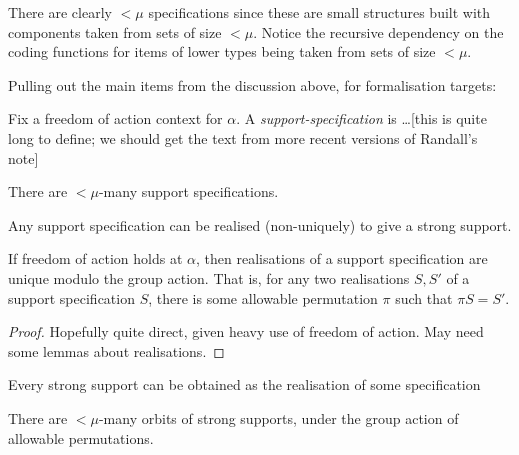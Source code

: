 There are clearly $<\mu$ specifications since these are small structures built with components taken from sets of size $<\mu$.  Notice the recursive dependency on the coding functions for items of lower types being taken from sets of size $<\mu$.

Pulling out the main items from the discussion above, for formalisation targets:

\begin{definition}
  \label{def:support-spec}
  Fix a freedom of action context for $\alpha$.  A \emph{support-specification} is \ldots [this is quite long to define; we should get the text from more recent versions of Randall’s note]
\end{definition}

\begin{lemma}
  \label{lem:count-support-specs}
  There are $<\mu$-many support specifications.
\end{lemma}

\begin{definition}
  \label{def:support-spec-realisation}
  Any support specification can be realised (non-uniquely) to give a strong support.
\end{definition}

\begin{lemma}
  \label{lem:support-spec-realisation-unique}
  If freedom of action holds at $\alpha$, then realisations of a support specification are unique modulo the group action.  That is, for any two realisations $S, S'$ of a support specification $S$, there is some allowable permutation $\pi$ such that $\pi S = S'$.
\end{lemma}

\begin{proof}
  Hopefully quite direct, given heavy use of freedom of action.  May need some lemmas about realisations.
\end{proof}

\begin{lemma}
  \label{lem:strong-support-has-spec}
  Every strong support can be obtained as the realisation of some specification
\end{lemma}

\begin{corollary}
  \label{cor:count-strong-supports}
  There are $<\mu$-many orbits of strong supports, under the group action of allowable permutations.
\end{corollary}

